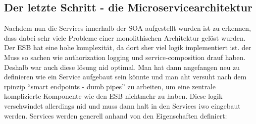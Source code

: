 \subsection{Der letzte Schritt - die Microservicearchitektur}

Nachdem nun die Services innerhalb der \ac{SOA} aufgestellt wurden ist zu erkennen, dass dabei sehr viele Probleme einer monolithischen Architektur gelöst wurden. \autocite{Silveira2016} Der ESB hat eine hohe komplexität, da dort sher viel logik implementiert ist. der Muss so sachen wie authorization logging und service-composition drauf haben. Deshalb war auch diese lösung nid optimal. Man hat dann angefangen neu zu definieren wie ein Service aufgebaut sein könnte und man aht versuht nach dem rpinzip \enquote{smart endpoints - dumb pipes} zu arbeiten, um eine zentrale komplizierte Komponente wie den ESB nichtmehr zu haben. Diese logik verschwindet allerdings nid und muss dann halt in den Services iwo eingebaut werden. Services werden generell anhand von den Eigenschaften definiert:

